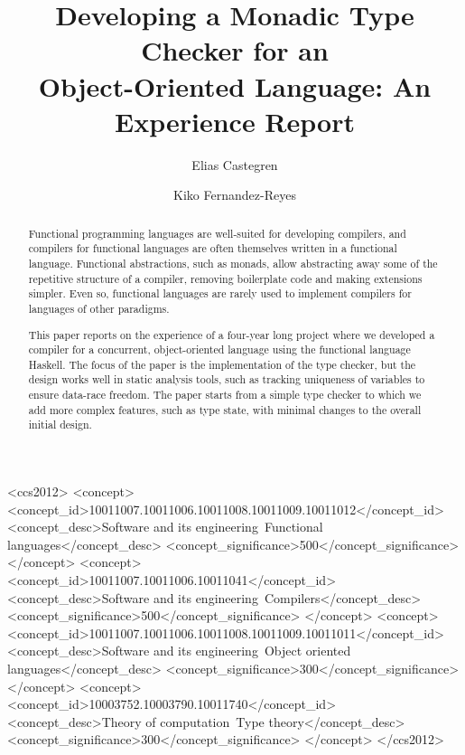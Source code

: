 \documentclass[sigplan,screen]{acmart}
\begin{document}
\lstset{language=Haskell}

\title[Developing a Monadic Type Checker for an OO Language]{Developing a Monadic Type Checker for an\\
Object-Oriented Language: An Experience Report}


\author{Elias Castegren}

\author{Kiko Fernandez-Reyes}


\begin{abstract}
Functional programming languages are well-suited for developing
compilers, and compilers for functional languages are often
themselves written in a functional language. Functional
abstractions, such as monads, allow abstracting away some of the
repetitive structure of a compiler, removing boilerplate code
and making extensions simpler. Even so, functional languages are
rarely used to implement compilers for languages of other
paradigms.

This paper reports on the experience of a four-year long project
where we developed a compiler for a concurrent, object-oriented language
using the functional language Haskell. The focus of the paper is
the implementation of the type checker, but the design works well
in static analysis tools, such as tracking uniqueness of variables to ensure data-race freedom.
The paper starts from a simple type checker to which we add more complex
features, such as type state, with minimal changes to the overall initial design.
\end{abstract}


 \begin{CCSXML}
<ccs2012>
<concept>
<concept_id>10011007.10011006.10011008.10011009.10011012</concept_id>
<concept_desc>Software and its engineering~Functional languages</concept_desc>
<concept_significance>500</concept_significance>
</concept>
<concept>
<concept_id>10011007.10011006.10011041</concept_id>
<concept_desc>Software and its engineering~Compilers</concept_desc>
<concept_significance>500</concept_significance>
</concept>
<concept>
<concept_id>10011007.10011006.10011008.10011009.10011011</concept_id>
<concept_desc>Software and its engineering~Object oriented languages</concept_desc>
<concept_significance>300</concept_significance>
</concept>
<concept>
<concept_id>10003752.10003790.10011740</concept_id>
<concept_desc>Theory of computation~Type theory</concept_desc>
<concept_significance>300</concept_significance>
</concept>
</ccs2012>
\end{CCSXML}
\end{document}
